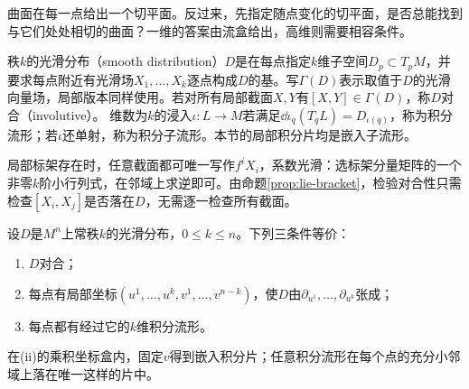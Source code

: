 曲面在每一点给出一个切平面。反过来，先指定随点变化的切平面，是否总能找到与它们处处相切的曲面？一维的答案由流盒给出，高维则需要相容条件。
\begin{definition}[光滑分布与积分子流形]
秩$k$的光滑分布（smooth distribution）$D$是在每点指定$k$维子空间$D_p\subset T_pM$，并要求每点附近有光滑场$X_1,\ldots,X_k$逐点构成$D$的基。写$\Gamma(D)$表示取值于$D$的光滑向量场，局部版本同样使用。若对所有局部截面$X,Y$有$[X,Y]\in\Gamma(D)$，称$D$对合（involutive）。
维数为$k$的浸入$\iota:L\to M$若满足$\dd\iota_q(T_qL)=D_{\iota(q)}$，称为积分流形；若$\iota$还单射，称为积分子流形。本节的局部积分片均是嵌入子流形。
\end{definition}
局部标架存在时，任意截面都可唯一写作$f^iX_i$，系数光滑：选标架分量矩阵的一个非零$k$阶小行列式，在邻域上求逆即可。由命题\ref{prop:lie-bracket}，检验对合性只需检查$[X_i,X_j]$是否落在$D$，无需逐一检查所有截面。
\begin{theorem}[Frobenius局部坐标定理]\label{thm:frobenius}
设$D$是$M^n$上常秩$k$的光滑分布，$0\leq k\leq n$。下列三条件等价：
\begin{enumerate}[label=(\roman*),nosep]
\item $D$对合；
\item 每点有局部坐标$(u^1,\ldots,u^k,v^1,\ldots,v^{n-k})$，使$D$由$\partial_{u^1},\ldots,\partial_{u^k}$张成；
\item 每点都有经过它的$k$维积分流形。
\end{enumerate}
在(ii)的乘积坐标盒内，固定$v$得到嵌入积分片；任意积分流形在每个点的充分小邻域上落在唯一这样的片中。
\end{theorem}
